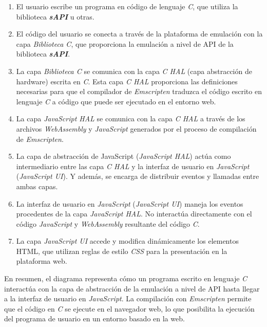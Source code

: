 \begin{enumerate}
	\item El usuario escribe un programa en código de lenguaje \textit{C}, que utiliza la biblioteca \textit{\textbf{sAPI}} u otras. 
	
	\item El código del usuario se conecta a través de la plataforma de emulación con la capa 
\textit{Biblioteca C}, que proporciona la emulación a nivel de API de la biblioteca \textit{\textbf{sAPI}}.
	
	\item La capa \textit{Biblioteca C} se comunica con la capa \textit{C HAL} (capa abstracción de hardware) escrita en \textit{C}. Esta capa \textit{C HAL} proporciona las definiciones necesarias para que el compilador de \textit{Emscripten} traduzca el código escrito en lenguaje \textit{C} a código que puede ser ejecutado en el entorno web.
	
	\item La capa \textit{JavaScript HAL} se comunica con la capa \textit{C HAL}  a través de los archivos \textit{WebAssembly} y \textit{JavaScript} generados por el proceso de compilación de \textit{Emscripten}.
	
	\item La capa de abstracción de JavaScript (\textit{JavaScript HAL}) actúa como intermediario entre las capa \textit{C HAL} y la interfaz de usuario en \textit{JavaScript} (\textit{JavaScript UI}). Y además, se encarga de distribuir eventos y llamadas entre ambas capas.
	
\item La interfaz de usuario en \textit{JavaScript} (\textit{JavaScript UI}) maneja los eventos procedentes de la capa \textit{JavaScript HAL}. No interactúa directamente con el código \textit{JavaScript} y \textit{WebAssembly} resultante del código \textit{C}.

\item La capa \textit{JavaScript UI} accede y modifica dinámicamente los elementos HTML, que utilizan reglas de estilo \textit{CSS} para la presentación en la plataforma web.
	
\end{enumerate}


En resumen, el diagrama representa cómo un programa escrito en lenguaje \textit{C} interactúa con la capa de abstracción de la emulación a nivel de API hasta llegar a la interfaz de usuario en \textit{JavaScript}. La compilación con \textit{Emscripten} permite que el código en \textit{C} se ejecute en el navegador web, lo que posibilita la ejecución del programa de usuario en un entorno basado en la web.


